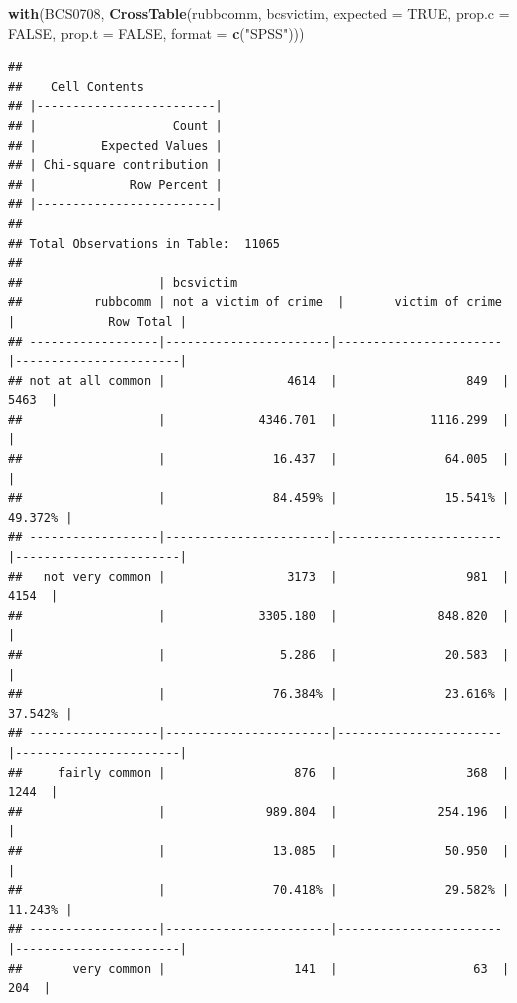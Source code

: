 \documentclass[]{book}
\newenvironment{Shaded}{\begin{snugshade}}{\end{snugshade}}
\newcommand{\DataTypeTok}[1]{\textcolor[rgb]{0.13,0.29,0.53}{#1}}
\newcommand{\KeywordTok}[1]{\textcolor[rgb]{0.13,0.29,0.53}{\textbf{#1}}}
\newcommand{\NormalTok}[1]{#1}
\newcommand{\OtherTok}[1]{\textcolor[rgb]{0.56,0.35,0.01}{#1}}
\newcommand{\StringTok}[1]{\textcolor[rgb]{0.31,0.60,0.02}{#1}}
\theoremstyle{definition}
\theoremstyle{definition}
\theoremstyle{definition}
\theoremstyle{remark}
\begin{document}
\begin{Shaded}
\begin{Highlighting}[]
\KeywordTok{with}\NormalTok{(BCS0708, }\KeywordTok{CrossTable}\NormalTok{(rubbcomm, bcsvictim, }\DataTypeTok{expected =} \OtherTok{TRUE}\NormalTok{, }\DataTypeTok{prop.c =} \OtherTok{FALSE}\NormalTok{, }\DataTypeTok{prop.t =} \OtherTok{FALSE}\NormalTok{, }\DataTypeTok{format =} \KeywordTok{c}\NormalTok{(}\StringTok{"SPSS"}\NormalTok{)))}
\end{Highlighting}
\end{Shaded}

\begin{verbatim}
## 
##    Cell Contents
## |-------------------------|
## |                   Count |
## |         Expected Values |
## | Chi-square contribution |
## |             Row Percent |
## |-------------------------|
## 
## Total Observations in Table:  11065 
## 
##                   | bcsvictim 
##          rubbcomm | not a victim of crime  |       victim of crime  |             Row Total | 
## ------------------|-----------------------|-----------------------|-----------------------|
## not at all common |                 4614  |                  849  |                 5463  | 
##                   |             4346.701  |             1116.299  |                       | 
##                   |               16.437  |               64.005  |                       | 
##                   |               84.459% |               15.541% |               49.372% | 
## ------------------|-----------------------|-----------------------|-----------------------|
##   not very common |                 3173  |                  981  |                 4154  | 
##                   |             3305.180  |              848.820  |                       | 
##                   |                5.286  |               20.583  |                       | 
##                   |               76.384% |               23.616% |               37.542% | 
## ------------------|-----------------------|-----------------------|-----------------------|
##     fairly common |                  876  |                  368  |                 1244  | 
##                   |              989.804  |              254.196  |                       | 
##                   |               13.085  |               50.950  |                       | 
##                   |               70.418% |               29.582% |               11.243% | 
## ------------------|-----------------------|-----------------------|-----------------------|
##       very common |                  141  |                   63  |                  204  | 

\end{verbatim}
\end{document}
